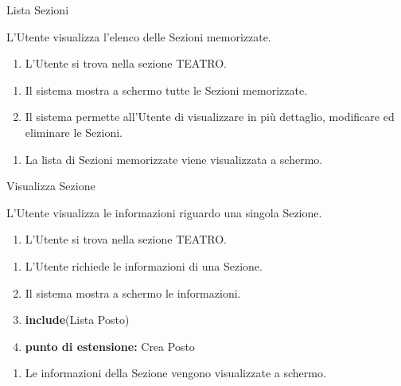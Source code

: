 {\ucTable	%
	{	%
		Lista Sezioni
		
	}{	%
		
	}{	%
		L'Utente visualizza l'elenco delle Sezioni memorizzate.
		
	}{	%
		\attori
	}{	%
		\begin{enumerate}
			\item L'Utente si trova nella sezione TEATRO.
		\end{enumerate}
		
	}{	%
		\begin{enumerate}
            \item Il sistema mostra a schermo tutte le Sezioni memorizzate.
            \item Il sistema permette all'Utente di visualizzare in più dettaglio, modificare ed eliminare le Sezioni.
		\end{enumerate}
		
	}{	%
		\begin{enumerate}
			\item La lista di Sezioni memorizzate viene visualizzata a schermo.
		\end{enumerate}
		
	}{	%
} }


{\ucTable	%
{	%
    Visualizza Sezione
    
}{	%
    
}{	%
    L'Utente visualizza le informazioni riguardo una singola Sezione.
    
}{	%
    \attori
}{	%
    \begin{enumerate}
        \item L'Utente si trova nella sezione TEATRO.
    \end{enumerate}
    
}{	%
    \begin{enumerate}
        \item L'Utente richiede le informazioni di una Sezione.
        \item Il sistema mostra a schermo le informazioni.
        \item \textbf{include}(Lista Posto) %
        \item[] \textbf{punto di estensione:} Crea Posto
    \end{enumerate}
    
}{	%
    \begin{enumerate}
        \item Le informazioni della Sezione vengono visualizzate a schermo.
    \end{enumerate}
    
}{	%
} }


